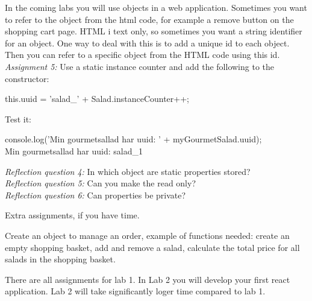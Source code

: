 \documentclass[fleqn, article, a4paper]{memoir}
\begin{document}
\begin{Assignments}
\item In the coming labs you will use  objects in a web application. Sometimes you want to refer to the object from the html code, for example a remove button on the shopping cart page. HTML i text only, so sometimes you want a string identifier for an object. One way to deal with this is to add a unique id to each  object. Then you can refer to a specific object from the HTML code using this id. 
\\\emph{Assignment 5:}
Use a static instance counter and add the following to the  constructor:
\begin{Code}
    this.uuid = 'salad_' + Salad.instanceCounter++;
\end{Code}
Test it:
\begin{Code}
console.log('Min gourmetsallad har uuid: ' + myGourmetSalad.uuid);
\\ Min gourmetsallad har uuid: salad_1
\end{Code}
\emph{Reflection question 4:} In which object are static properties stored?
\\\emph{Reflection question 5:} Can you make the  read only?
\\\emph{Reflection question 6:} Can properties be private?

\end{Assignments}

\noindent Extra assignments, if you have time.
\begin{Assignments}

\item Create an object to manage an order, example of functions needed: create an empty shopping basket, add and remove a salad, calculate the total price for all salads in the shopping basket.

\end{Assignments}

\noindent There are all assignments for lab 1. In Lab 2 you will develop your first react application. Lab 2 will take significantly loger time compared to lab 1.


\end{document}
